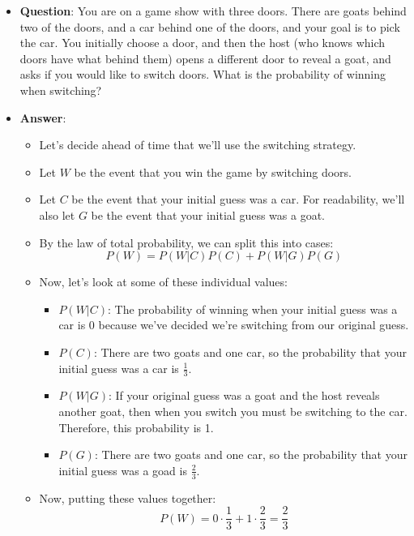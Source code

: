 \documentclass{article}
\begin{document}
\begin{itemize}
    \item \textbf{Question}: You are on a game show with three doors. There are goats behind two of the doors, and a car behind one of the doors, and your goal is to pick the car. You initially choose a door, and then the host (who knows which doors have what behind them) opens a different door to reveal a goat, and asks if you would like to switch doors. What is the probability of winning when switching?
    \item \textbf{Answer}:
    \begin{itemize}
        \item Let's decide ahead of time that we'll use the switching strategy.
        \item Let $W$ be the event that you win the game by switching doors.
        \item Let $C$ be the event that your initial guess was a car. For readability, we'll also let $G$ be the event that your initial guess was a goat.
        \item By the law of total probability, we can split this into cases:
        $$P(W) = P(W|C)P(C) + P(W|G)P(G)$$
        \item Now, let's look at some of these individual values:
        \begin{itemize}
            \item $P(W|C)$: The probability of winning when your initial guess was a car is 0 because we've decided we're switching from our original guess.
            \item $P(C)$: There are two goats and one car, so the probability that your initial guess was a car is $\frac{1}{3}$.
            \item $P(W|G)$: If your original guess was a goat and the host reveals another goat, then when you switch you must be switching to the car. Therefore, this probability is 1.
            \item $P(G)$: There are two goats and one car, so the probability that your initial guess was a goad is $\frac{2}{3}$.
        \end{itemize}
        \item Now, putting these values together:
        $$P(W) = 0 \cdot \frac{1}{3} + 1 \cdot \frac{2}{3} = \boxed{\frac{2}{3}}$$
    \end{itemize}
\end{itemize}
\end{document}
